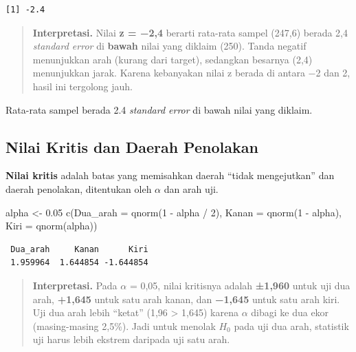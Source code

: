 \documentclass[
  indonesian,
  letterpaper,
]{book}
\newenvironment{Shaded}{\begin{snugshade}}{\end{snugshade}}
\newcommand{\AttributeTok}[1]{\textcolor[rgb]{0.40,0.45,0.13}{#1}}
\newcommand{\DecValTok}[1]{\textcolor[rgb]{0.68,0.00,0.00}{#1}}
\newcommand{\FloatTok}[1]{\textcolor[rgb]{0.68,0.00,0.00}{#1}}
\newcommand{\FunctionTok}[1]{\textcolor[rgb]{0.28,0.35,0.67}{#1}}
\newcommand{\NormalTok}[1]{\textcolor[rgb]{0.00,0.23,0.31}{#1}}
\newcommand{\OtherTok}[1]{\textcolor[rgb]{0.00,0.23,0.31}{#1}}
\newcommand{\SpecialCharTok}[1]{\textcolor[rgb]{0.37,0.37,0.37}{#1}}
\begin{document}
\begin{verbatim}
[1] -2.4
\end{verbatim}

\begin{quote}
\textbf{Interpretasi.} Nilai \textbf{z = −2,4} berarti rata-rata sampel
(247,6) berada 2,4 \emph{standard error} di \textbf{bawah} nilai yang
diklaim (250). Tanda negatif menunjukkan arah (kurang dari target),
sedangkan besarnya (2,4) menunjukkan jarak. Karena kebanyakan nilai z
berada di antara −2 dan 2, hasil ini tergolong jauh.
\end{quote}

Rata-rata sampel berada 2.4 \emph{standard error} di bawah nilai yang
diklaim.

\subsection{Nilai Kritis dan Daerah
Penolakan}\label{nilai-kritis-dan-daerah-penolakan}

\textbf{Nilai kritis} adalah batas yang memisahkan daerah ``tidak
mengejutkan'' dan daerah penolakan, ditentukan oleh \(\alpha\) dan arah
uji.

\begin{Shaded}
\begin{Highlighting}[]
\NormalTok{alpha }\OtherTok{\textless{}{-}} \FloatTok{0.05}
\FunctionTok{c}\NormalTok{(}\AttributeTok{Dua\_arah =} \FunctionTok{qnorm}\NormalTok{(}\DecValTok{1} \SpecialCharTok{{-}}\NormalTok{ alpha }\SpecialCharTok{/} \DecValTok{2}\NormalTok{), }\AttributeTok{Kanan =} \FunctionTok{qnorm}\NormalTok{(}\DecValTok{1} \SpecialCharTok{{-}}\NormalTok{ alpha), }\AttributeTok{Kiri =} \FunctionTok{qnorm}\NormalTok{(alpha))}
\end{Highlighting}
\end{Shaded}

\begin{verbatim}
 Dua_arah     Kanan      Kiri 
 1.959964  1.644854 -1.644854 
\end{verbatim}

\begin{quote}
\textbf{Interpretasi.} Pada \(\alpha\) = 0,05, nilai kritisnya adalah
\textbf{±1,960} untuk uji dua arah, \textbf{+1,645} untuk satu arah
kanan, dan \textbf{−1,645} untuk satu arah kiri. Uji dua arah lebih
``ketat'' (1,96 \textgreater{} 1,645) karena \(\alpha\) dibagi ke dua
ekor (masing-masing 2,5\%). Jadi untuk menolak \(H_0\) pada uji dua
arah, statistik uji harus lebih ekstrem daripada uji satu arah.
\end{quote}
\end{document}
